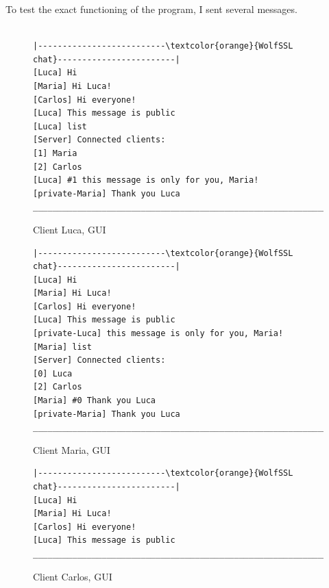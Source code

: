 \documentclass[a4paper,12pt]{article}
\begin{document}
To test the exact functioning of the program, I sent several messages.
\begin{figure}[H]
\begin{Verbatim}[commandchars=\\\{\}]

|--------------------------\textcolor{orange}{WolfSSL chat}------------------------|
[Luca] Hi                          
[Maria] Hi Luca!
[Carlos] Hi everyone!
[Luca] This message is public
[Luca] list
[Server] Connected clients:
[1] Maria
[2] Carlos
[Luca] #1 this message is only for you, Maria!
[private-Maria] Thank you Luca
______________________________________________________________|
\end{Verbatim}
\caption{Client Luca, GUI}
\end{figure}

\begin{figure}[H]
\begin{Verbatim}[commandchars=\\\{\}]
|--------------------------\textcolor{orange}{WolfSSL chat}------------------------|
[Luca] Hi                          
[Maria] Hi Luca!
[Carlos] Hi everyone!
[Luca] This message is public
[private-Luca] this message is only for you, Maria!
[Maria] list
[Server] Connected clients:
[0] Luca
[2] Carlos
[Maria] #0 Thank you Luca
[private-Maria] Thank you Luca
______________________________________________________________|
\end{Verbatim}
\caption{Client Maria, GUI}
\end{figure}

\begin{figure}[H]
\begin{Verbatim}[commandchars=\\\{\}]
|--------------------------\textcolor{orange}{WolfSSL chat}------------------------|
[Luca] Hi                          
[Maria] Hi Luca!
[Carlos] Hi everyone!
[Luca] This message is public
______________________________________________________________|
\end{Verbatim}
\caption{Client Carlos, GUI}
\end{figure}
\end{document}
